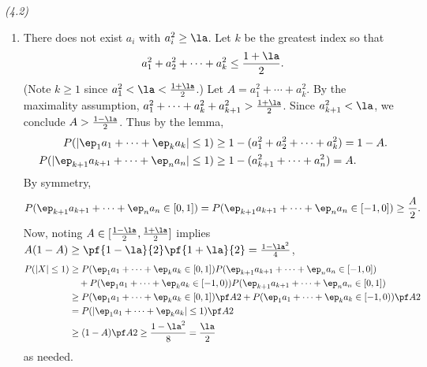 \begin{problem} {\it (4.2)}
\begin{enumerate}
\item
There does not exist $a_i$ with $a_i^2\ge \la$. Let $k$ be the greatest index so that
\[
a_1^2+a_2^2+\cdots +a_k^2\le \frac{1+\la}{2}.
\]
(Note $k\ge 1$ since $a_1^2< \la<\frac{1+\la}{2}$.) 
Let $A=a_1^2+\cdots +a_k^2$. 
By the maximality assumption, $a_1^2+\cdots +a_k^2+a_{k+1}^2>\frac{1+\la}{2}$. Since $a_{k+1}^2<\la$, we conclude $A>\frac{1-\la}{2}$. 
Thus by the lemma,
\begin{align*}
P(|\ep_1a_1+\cdots +\ep_ka_k|\le 1)&\ge 1-(a_1^2+a_2^2+\cdots +a_k^2) =1-A.\\
P(|\ep_{k+1}a_{k+1}+\cdots +\ep_na_n|\le 1)&\ge 1-(a_{k+1}^2+\cdots +a_n^2)=A.
\end{align*}
By symmetry, 
\[
P(\ep_{k+1}a_{k+1}+\cdots +\ep_na_n\in [0,1])=
P(\ep_{k+1}a_{k+1}+\cdots +\ep_na_n\in [-1,0])
\ge\frac{A}{2}.
\]
Now, noting $A\in [\frac{1-\la}{2},\frac{1+\la}{2}]$ implies $A(1-A)\ge \pf{1-\la}{2}\pf{1+\la}{2}=\frac{1-\la^2}{4}$,
\begin{align*}
P(|X|\le 1)&\ge P(\ep_1a_1+\cdots +\ep_ka_k \in [0,1])P(\ep_{k+1}a_{k+1}+\cdots +\ep_na_n\in [-1,0])\\
&\quad +P(\ep_1a_1+\cdots +\ep_ka_k \in [-1,0))P(\ep_{k+1}a_{k+1}+\cdots +\ep_na_n\in [0,1])\\
&\ge P(\ep_1a_1+\cdots +\ep_ka_k \in [0,1])\pf A2+P(\ep_1a_1+\cdots +\ep_ka_k \in [-1,0))\pf A2\\
&=P(|\ep_1a_1+\cdots +\ep_ka_k|\le 1)\pf A2\\
&\ge (1-A)\pf A2\ge \frac{1-\la^2}{8}=\frac{\la}{2}
\end{align*}
as needed.
\end{enumerate}
\end{problem}

